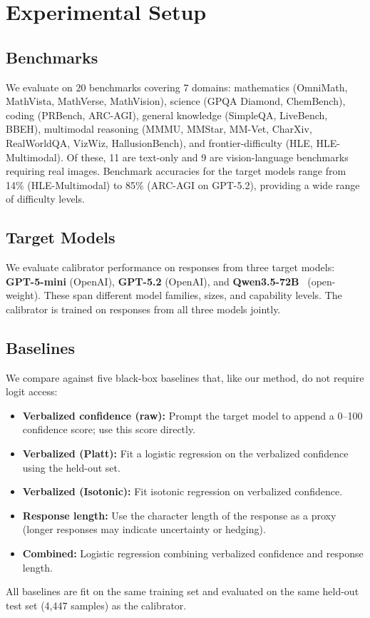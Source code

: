 \documentclass{colm2026}
\begin{document}
\section{Experimental Setup}
\label{sec:setup}

\subsection{Benchmarks}
We evaluate on 20 benchmarks covering 7 domains: mathematics (OmniMath, MathVista, MathVerse, MathVision), science (GPQA Diamond, ChemBench), coding (PRBench, ARC-AGI), general knowledge (SimpleQA, LiveBench, BBEH), multimodal reasoning (MMMU, MMStar, MM-Vet, CharXiv, RealWorldQA, VizWiz, HallusionBench), and frontier-difficulty (HLE, HLE-Multimodal). Of these, 11 are text-only and 9 are vision-language benchmarks requiring real images. Benchmark accuracies for the target models range from 14\% (HLE-Multimodal) to 85\% (ARC-AGI on GPT-5.2), providing a wide range of difficulty levels.

\subsection{Target Models}
We evaluate calibrator performance on responses from three target models: \textbf{GPT-5-mini} (OpenAI), \textbf{GPT-5.2} (OpenAI), and \textbf{Qwen3.5-72B}~\citep{qwen3.5} (open-weight). These span different model families, sizes, and capability levels. The calibrator is trained on responses from all three models jointly.

\subsection{Baselines}
We compare against five black-box baselines that, like our method, do not require logit access:
\begin{itemize}
    \item \textbf{Verbalized confidence (raw):} Prompt the target model to append a 0--100 confidence score; use this score directly.
    \item \textbf{Verbalized (Platt):} Fit a logistic regression on the verbalized confidence using the held-out set.
    \item \textbf{Verbalized (Isotonic):} Fit isotonic regression on verbalized confidence.
    \item \textbf{Response length:} Use the character length of the response as a proxy (longer responses may indicate uncertainty or hedging).
    \item \textbf{Combined:} Logistic regression combining verbalized confidence and response length.
\end{itemize}
All baselines are fit on the same training set and evaluated on the same held-out test set (4,447 samples) as the calibrator.
\end{document}
